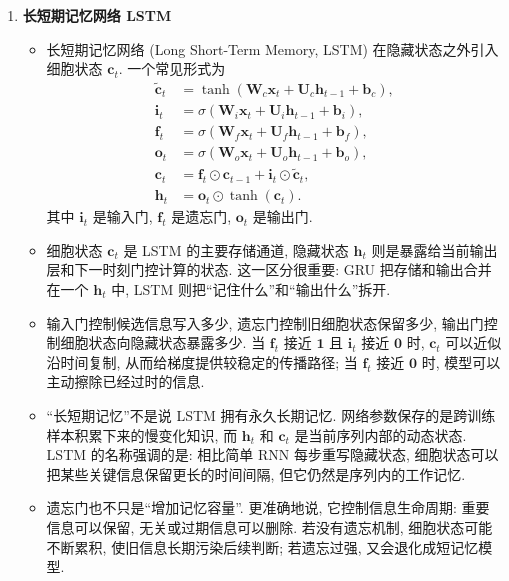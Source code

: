 \documentclass{../nndlcourse}
\begin{document}
\begin{enumerate}
\item \textbf{长短期记忆网络 LSTM}
  \begin{itemize}
    \item 长短期记忆网络 (Long Short-Term Memory, LSTM) 在隐藏状态之外引入细胞状态 $\boldsymbol{c}_t$. 一个常见形式为
    \begin{align*}
      \tilde{\boldsymbol{c}}_t
      &= \tanh\left(\boldsymbol{W}_c\boldsymbol{x}_t
        + \boldsymbol{U}_c\boldsymbol{h}_{t-1}+\boldsymbol{b}_c\right), \\
      \boldsymbol{i}_t
      &= \sigma\left(\boldsymbol{W}_i\boldsymbol{x}_t
        + \boldsymbol{U}_i\boldsymbol{h}_{t-1}+\boldsymbol{b}_i\right), \\
      \boldsymbol{f}_t
      &= \sigma\left(\boldsymbol{W}_f\boldsymbol{x}_t
        + \boldsymbol{U}_f\boldsymbol{h}_{t-1}+\boldsymbol{b}_f\right), \\
      \boldsymbol{o}_t
      &= \sigma\left(\boldsymbol{W}_o\boldsymbol{x}_t
        + \boldsymbol{U}_o\boldsymbol{h}_{t-1}+\boldsymbol{b}_o\right), \\
      \boldsymbol{c}_t
      &= \boldsymbol{f}_t\odot\boldsymbol{c}_{t-1}
        + \boldsymbol{i}_t\odot\tilde{\boldsymbol{c}}_t, \\
      \boldsymbol{h}_t
      &= \boldsymbol{o}_t\odot\tanh(\boldsymbol{c}_t).
    \end{align*}
    其中 $\boldsymbol{i}_t$ 是输入门, $\boldsymbol{f}_t$ 是遗忘门, $\boldsymbol{o}_t$ 是输出门.
    \item 细胞状态 $\boldsymbol{c}_t$ 是 LSTM 的主要存储通道, 隐藏状态 $\boldsymbol{h}_t$ 则是暴露给当前输出层和下一时刻门控计算的状态. 这一区分很重要: GRU 把存储和输出合并在一个 $\boldsymbol{h}_t$ 中, LSTM 则把“记住什么”和“输出什么”拆开.
    \item 输入门控制候选信息写入多少, 遗忘门控制旧细胞状态保留多少, 输出门控制细胞状态向隐藏状态暴露多少. 当 $\boldsymbol{f}_t$ 接近 $\mathbf{1}$ 且 $\boldsymbol{i}_t$ 接近 $\boldsymbol{0}$ 时, $\boldsymbol{c}_t$ 可以近似沿时间复制, 从而给梯度提供较稳定的传播路径; 当 $\boldsymbol{f}_t$ 接近 $\boldsymbol{0}$ 时, 模型可以主动擦除已经过时的信息.
    \item “长短期记忆”不是说 LSTM 拥有永久长期记忆. 网络参数保存的是跨训练样本积累下来的慢变化知识, 而 $\boldsymbol{h}_t$ 和 $\boldsymbol{c}_t$ 是当前序列内部的动态状态. LSTM 的名称强调的是: 相比简单 RNN 每步重写隐藏状态, 细胞状态可以把某些关键信息保留更长的时间间隔, 但它仍然是序列内的工作记忆.
    \item 遗忘门也不只是“增加记忆容量”. 更准确地说, 它控制信息生命周期: 重要信息可以保留, 无关或过期信息可以删除. 若没有遗忘机制, 细胞状态可能不断累积, 使旧信息长期污染后续判断; 若遗忘过强, 又会退化成短记忆模型.
  \end{itemize}


\end{enumerate}
\end{document}
